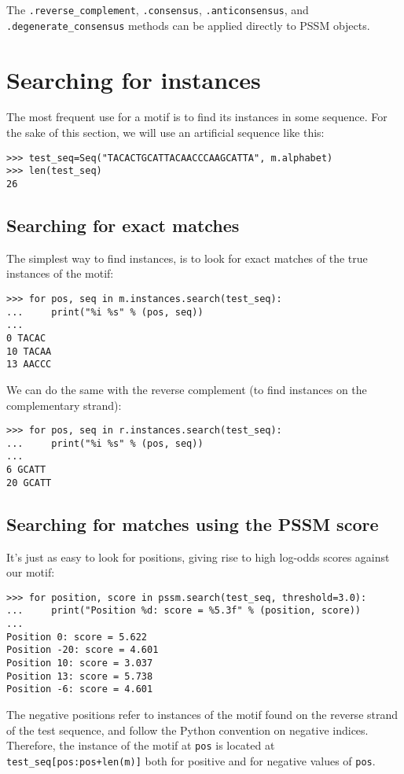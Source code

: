 The \verb+.reverse_complement+, \verb+.consensus+, \verb+.anticonsensus+, and
\verb+.degenerate_consensus+ methods can be applied directly to PSSM objects.

\section{Searching for instances}
\label{sec:search}

The most frequent use for a motif is to find its instances in some
sequence. For the sake of this section, we will use an artificial sequence like this:

\begin{verbatim}
>>> test_seq=Seq("TACACTGCATTACAACCCAAGCATTA", m.alphabet)
>>> len(test_seq)
26
\end{verbatim}

\subsection{Searching for exact matches}

The simplest way to find instances, is to look for exact matches of
the true instances of the motif:
\begin{verbatim}
>>> for pos, seq in m.instances.search(test_seq):
...     print("%i %s" % (pos, seq))
...
0 TACAC
10 TACAA
13 AACCC
\end{verbatim}
We can do the same with the reverse complement (to find instances on the complementary strand):
\begin{verbatim}
>>> for pos, seq in r.instances.search(test_seq):
...     print("%i %s" % (pos, seq))
...
6 GCATT
20 GCATT
\end{verbatim}

\subsection{Searching for matches using the PSSM score}

It's just as easy to look for positions, giving rise to high log-odds scores against our motif:
\begin{verbatim}
>>> for position, score in pssm.search(test_seq, threshold=3.0):
...     print("Position %d: score = %5.3f" % (position, score))
...
Position 0: score = 5.622
Position -20: score = 4.601
Position 10: score = 3.037
Position 13: score = 5.738
Position -6: score = 4.601
\end{verbatim}
The negative positions refer to instances of the motif found on the
reverse strand of the test sequence, and follow the Python convention
on negative indices. Therefore, the instance of the motif at \verb|pos|
is located at \verb|test_seq[pos:pos+len(m)]| both for positive and for
negative values of \verb|pos|.

